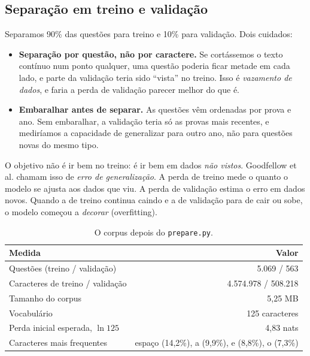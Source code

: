\documentclass[11pt,a4paper]{article}
\begin{document}
\subsection{Separação em treino e validação}

Separamos 90\% das questões para treino e 10\% para validação. Dois cuidados:

\begin{itemize}
\item \textbf{Separação por questão, não por caractere.} Se cortássemos o texto contínuo num ponto qualquer, uma questão poderia ficar metade em cada lado, e parte da validação teria sido ``vista'' no treino. Isso é \emph{vazamento de dados}, e faria a perda de validação parecer melhor do que é.
\item \textbf{Embaralhar antes de separar.} As questões vêm ordenadas por prova e ano. Sem embaralhar, a validação teria só as provas mais recentes, e mediríamos a capacidade de generalizar para outro ano, não para questões novas do mesmo tipo.
\end{itemize}

\begin{teoria}
O objetivo não é ir bem no treino: é ir bem em dados \emph{não vistos}. Goodfellow et al. \cite[seção~5.2]{goodfellow} chamam isso de \emph{erro de generalização}. A perda de treino mede o quanto o modelo se ajusta aos dados que viu. A perda de validação estima o erro em dados novos. Quando a de treino continua caindo e a de validação para de cair ou sobe, o modelo começou a \emph{decorar} (overfitting).
\end{teoria}

\begin{table}[H]
\centering
\begin{tabular}{@{}lr@{}}
\toprule
Medida & Valor \\
\midrule
Questões (treino / validação) & 5.069 / 563 \\
Caracteres de treino / validação & 4.574.978 / 508.218 \\
Tamanho do corpus & 5,25 MB \\
Vocabulário & 125 caracteres \\
Perda inicial esperada, $\ln 125$ & 4,83 nats \\
Caracteres mais frequentes & espaço (14,2\%), a (9,9\%), e (8,8\%), o (7,3\%) \\
\bottomrule
\end{tabular}
\caption{O corpus depois do \texttt{prepare.py}.}
\label{tab:corpus}
\end{table}
\end{document}
